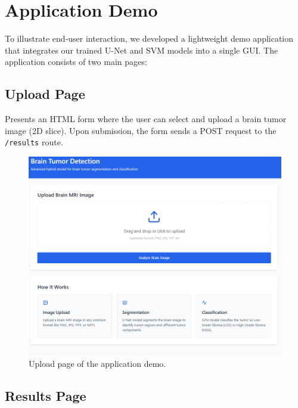 \section{Application Demo}
\label{sec:contribution-demo}

To illustrate end‐user interaction, we developed a lightweight demo application that integrates our trained U-Net and SVM models into a single GUI. The application  consists of two main pages:

\subsection{Upload Page}
\label{sec:contribution-demo-upload}

Presents an HTML form where the user can select and upload a brain tumor image (2D slice).
Upon submission, the form sends a POST request to the \texttt{/results} route.

\begin{figure}[H]
  \centering
  \includegraphics[width=1\textwidth]{Images/Chapter3/app_interface.png}
  \caption{Upload page of the application demo.}
  \label{fig:demo-upload}
\end{figure}

\subsection{Results Page}
\label{sec:contribution-demo-results}

